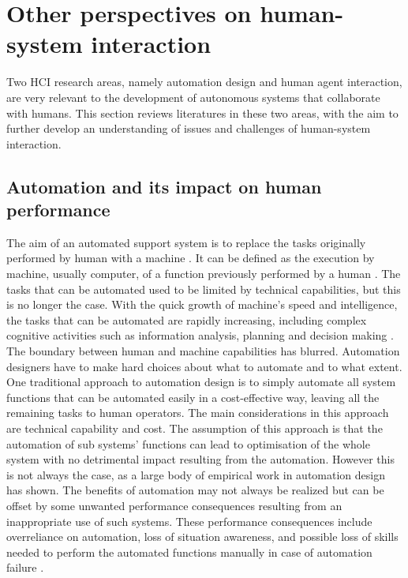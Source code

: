 


\section{Other perspectives on human-system interaction}
Two \ac{HCI} research areas, namely automation design and human agent interaction, are very relevant to the development of autonomous systems that collaborate with humans. This section reviews literatures in these two areas, with the aim to further develop an understanding of issues and challenges of human-system interaction. \\


\subsection{Automation and its impact on human performance}
The aim of an automated support system is to replace the tasks originally performed by human with a machine \citep{Bradshaw2011}. It can be defined as the execution by machine, usually computer, of a function previously performed by a human \citep{Parasuraman1997}. The tasks that can be automated used to be limited by technical capabilities, but this is no longer the case. With the quick growth of machine's speed and intelligence, the tasks that can be automated are rapidly increasing, including complex cognitive activities such as information analysis, planning and decision making \citep{Parasuraman2000}. The boundary between human and machine capabilities has blurred. Automation designers have to make hard choices about what to automate and to what extent.\\

One traditional approach to automation design is to simply automate all system functions that can be automated easily in a cost-effective way, leaving all the remaining tasks to human operators. The main considerations in this approach are technical capability and cost. The assumption of this approach is that the automation of sub systems' functions can lead to optimisation of the whole system with no detrimental impact resulting from the automation. However this is not always the case, as a large body of empirical work in automation design \citep{Manzey2012,Parasuraman2000} has shown. The benefits of automation may not always be realized but can be offset by some unwanted performance consequences resulting from an inappropriate use of such systems. These performance consequences include overreliance on automation, loss of situation awareness, and possible loss of skills needed to perform the automated functions manually in case of automation failure \citep{Kaber1997}.\\ 

